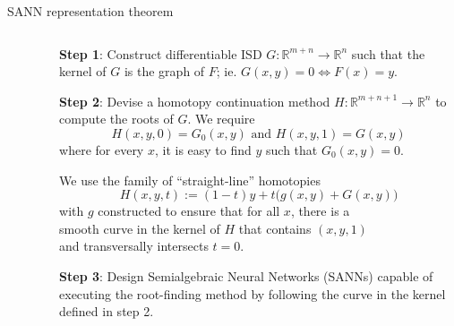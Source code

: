 \documentclass[final]{beamer}
\newcommand{\defeq}{:=}
\newlength{\lrcolwidth}
\begin{document}
\begin{frame}[t]
\begin{columns}[t]
\begin{column}{\lrcolwidth}
\begin{block}{SANN representation theorem}
\begin{columns}[t]
\begin{column}{0.19\textwidth}
\begin{figure}[t]
        \end{figure}
      \end{column}
      \begin{column}{0.6\textwidth}


          \textbf{Step 1}: Construct differentiable ISD $G: \mathbb{R}^{m+n} \to \mathbb{R}^n$ such that the kernel of $G$ is the graph of $F$; ie. $G(x, y) = 0 \Leftrightarrow F(x) = y$.

          \vspace{1cm}
          \textbf{Step 2}: Devise a homotopy continuation method $H: \mathbb{R}^{m+n+1} \to \mathbb{R}^n$  to compute the roots of $G$. We require
          \begin{equation*}
            H(x, y, 0) = G_0(x, y) \text{ and } H(x, y, 1) = G(x, y)
          \end{equation*}
          where for every $x$, it is easy to find $y$ such that $G_0(x, y) = 0$.

          We use the family of ``straight-line'' homotopies
          \begin{equation*}
            H (x, y, t) \defeq (1-t) y + t \big( g(x,y) + G(x,y) \big)
          \end{equation*}
          with $g$ constructed to ensure that for all $x$, there is a \\ smooth curve in the kernel of $H$ that contains $(x, y, 1)$\\ and transversally intersects $t=0$.

          \vspace{1cm}
          \textbf{Step 3}: Design Semialgebraic Neural Networks (SANNs) capable of executing the root-finding method by following the curve in the kernel defined in step 2.
      \end{column}
      

\end{columns}
\end{block}
\end{column}
\end{columns}
\end{frame}
\end{document}
